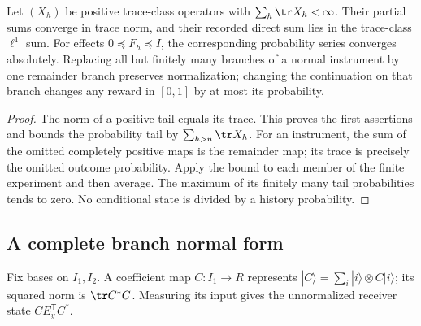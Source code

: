 \begin{lemma}\label{lem:countable91}
Let $(X_h)$ be positive trace-class operators with
$\sum_h\tr X_h<\infty$.  Their partial sums converge in trace norm,
and their recorded direct sum lies in the trace-class $\ell^1$ sum.
For effects $0\preceq F_h\preceq I$, the corresponding probability
series converges absolutely.  Replacing all but finitely many branches
of a normal instrument by one remainder branch preserves normalization;
changing the continuation on that branch changes any reward in $[0,1]$
by at most its probability.
\end{lemma}
\begin{proof}
The norm of a positive tail equals its trace.  This proves the first
assertions and bounds the probability tail by $\sum_{h>n}\tr X_h$.
For an instrument, the sum of the omitted completely positive maps is
the remainder map; its trace is precisely the omitted outcome
probability.  Apply the bound to each member of the finite experiment
and then average.  The maximum of its finitely many tail probabilities
tends to zero.  No conditional state is divided by a history probability.
\end{proof}

\subsection{A complete branch normal form}
Fix bases on $I_1,I_2$.  A coefficient map $C:I_1\to R$ represents
$|C\rangle=\sum_i|i\rangle\otimes C|i\rangle$; its squared norm is
$\tr C^*C$.  Measuring its input gives the unnormalized receiver state
$CE_y^{\mathsf T}C^*$.

